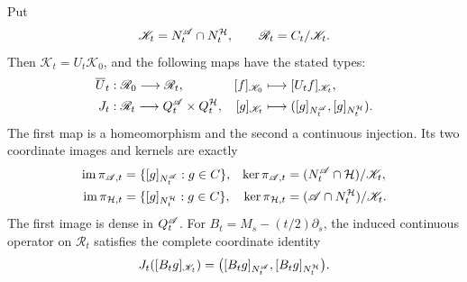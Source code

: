 \begin{theorem}
\label{ccb:simultaneous}
Put
\[
 \mathscr K_t=N_t^{\mathscr A}\cap N_t^{\mathcal H},\qquad
 \mathscr R_t=C_t/\mathscr K_t.
\]
Then $\mathscr K_t=U_t\mathscr K_0$, and the following maps have the stated types:
\begin{align}
 \overline U_t &: \mathscr R_0\longrightarrow\mathscr R_t,
       & [f]_{\mathscr K_0}&\longmapsto[U_tf]_{\mathscr K_t},\label{ccb:relation-heat}\\
 J_t &: \mathscr R_t\longrightarrow Q_t^{\mathscr A}\times Q_t^{\mathcal H},
       & [g]_{\mathscr K_t}&\longmapsto([g]_{N_t^{\mathscr A}},[g]_{N_t^{\mathcal H}}).
       \label{ccb:simultaneous-map}
\end{align}
The first map is a homeomorphism and the second a continuous
injection. Its two coordinate images and kernels are exactly
\begin{align*}
 \operatorname{im}\pi_{\mathscr A,t}&=\{[g]_{N_t^{\mathscr A}}:g\in C\},&
 \ker\pi_{\mathscr A,t}&=(N_t^{\mathscr A}\cap\mathcal H)/\mathscr K_t,\\
 \operatorname{im}\pi_{\mathcal H,t}&=\{[g]_{N_t^{\mathcal H}}:g\in C\},&
 \ker\pi_{\mathcal H,t}&=(\mathscr A\cap N_t^{\mathcal H})/\mathscr K_t.
\end{align*}
The first image is dense in $Q_t^{\mathscr A}$. For
$B_t=M_s-(t/2)\partial_s$, the induced continuous operator on
$\mathscr R_t$ satisfies the complete coordinate identity
\begin{equation}
 J_t([B_tg]_{\mathscr K_t})=
 \bigl([B_tg]_{N_t^{\mathscr A}},[B_tg]_{N_t^{\mathcal H}}\bigr).
 \label{ccb:simultaneous-operator}
\end{equation}
\end{theorem}
